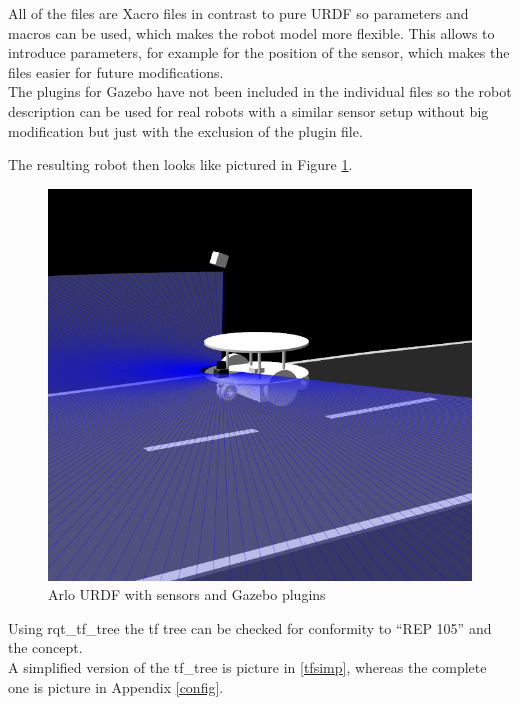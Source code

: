All of the files are Xacro files in contrast to pure URDF so parameters and macros can be used, which makes the robot model more flexible. This allows to introduce parameters, for example for the position of the sensor, which makes the files easier for future modifications.\\

The plugins for Gazebo have not been included in the individual files so the robot description can be used for real robots with a similar sensor setup without big modification but just with the exclusion of the plugin file.

The resulting robot then looks like pictured in Figure \ref{arlourdf}.

\begin{figure}[H]
	\includegraphics[width=\textwidth]{Pictures/arlourdf}
	\caption{Arlo URDF with sensors and Gazebo plugins}
	\label{arlourdf}
\end{figure}


Using rqt\_tf\_tree the tf tree can be checked for conformity to ``REP 105'' and the concept.\\ 

A simplified version of the tf\_tree is picture in \ref{tfsimp}, whereas the complete one is picture in Appendix \ref{config}.\\

